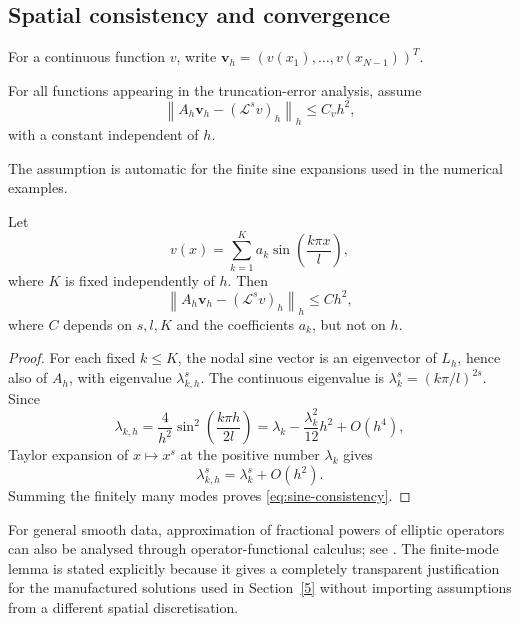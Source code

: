 \documentclass[reqno]{amsart}
\newcommand{\Lcal}{\mathcal L}
\newcommand{\Ah}{A_h}
\newcommand{\normh}[1]{\left\|#1\right\|_h}
\begin{document}
\subsection{Spatial consistency and convergence}
For a continuous function $v$, write
$\mathbf v_h=(v(x_1),\ldots,v(x_{N-1}))^T$.

\begin{assumption}\label{ass:space}
For all functions appearing in the truncation-error analysis, assume
\begin{equation}\label{eq:space-consistency-ass}
 \normh{\Ah\mathbf v_h-(\Lcal^s v)_h}\le C_v h^2,
\end{equation}
with a constant independent of $h$.
\end{assumption}

The assumption is automatic for the finite sine expansions used in the numerical examples.

\begin{lemma}\label{lem:sine-consistency}
Let
\begin{equation}\label{eq:finite-sine}
 v(x)=\sum_{k=1}^{K}a_k\sin\!\left(\frac{k\pi x}{l}\right),
\end{equation}
where $K$ is fixed independently of $h$. Then
\begin{equation}\label{eq:sine-consistency}
 \normh{\Ah\mathbf v_h-(\Lcal^s v)_h}\le C h^2,
\end{equation}
where $C$ depends on $s,l,K$ and the coefficients $a_k$, but not on $h$.
\end{lemma}
\begin{proof}
For each fixed $k\le K$, the nodal sine vector is an eigenvector of $L_h$, hence also of $\Ah$, with eigenvalue $\lambda_{k,h}^s$. The continuous eigenvalue is
$\lambda_k^s=(k\pi/l)^{2s}$. Since
\[
 \lambda_{k,h}
 =\frac4{h^2}\sin^2\!\left(\frac{k\pi h}{2l}\right)
 =\lambda_k-\frac{\lambda_k^2}{12}h^2+O(h^4),
\]
Taylor expansion of $x\mapsto x^s$ at the positive number $\lambda_k$ gives
\[
 \lambda_{k,h}^s=\lambda_k^s+O(h^2).
\]
Summing the finitely many modes proves \eqref{eq:sine-consistency}.
\end{proof}

\begin{remark}
For general smooth data, approximation of fractional powers of elliptic operators can also be analysed through operator-functional calculus; see \cite{BonitoPasciak15}. The finite-mode lemma is stated explicitly because it gives a completely transparent justification for the manufactured solutions used in Section~\ref{5} without importing assumptions from a different spatial discretisation.
\end{remark}
\end{document}
